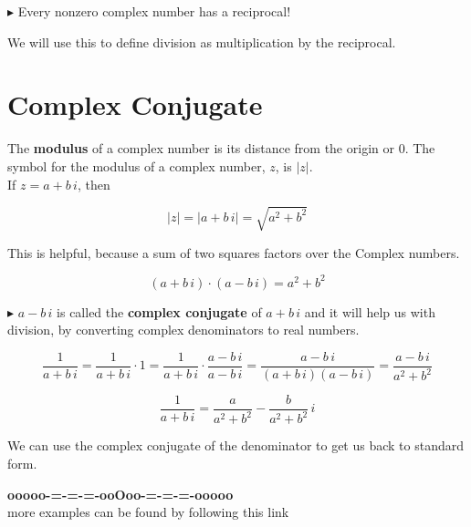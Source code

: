 \documentclass{ximera}
\begin{document}
$\blacktriangleright$  Every nonzero complex number has a reciprocal!  

We will use this to define division as multiplication by the reciprocal.





\section*{Complex Conjugate}


The \textbf{modulus} of a complex number is its distance from the origin or $0$.  The symbol for the modulus of a complex number, $z$, is $|z|$.  \\

If $z = a + b \, i$, then

\[    |z| = |a + b \, i| = \sqrt{a^2 + b^2}          \]



This is helpful, because a sum of two squares factors over the Complex numbers.



\[   (a + b \, i) \cdot    (a - b \, i)  = a^2 + b^2   \]



$\blacktriangleright$  $a - b \, i$ is called the \textbf{complex conjugate} of $a + b \, i$ and it will help us with division, by converting complex denominators to real numbers.




\[   \frac{1}{a + b \, i} =   \frac{1}{a + b \, i} \cdot 1 = \frac{1}{a + b \, i} \cdot \frac{a - b \, i}{a - b \, i}  =  \frac{a - b \, i}{(a + b \, i)(a - b \, i)} =   \frac{a - b \, i}{a^2 + b^2}  \]


\[  \frac{1}{a + b \, i}   =  \frac{a}{a^2 + b^2} - \frac{b}{a^2 + b^2} \, i      \]


We can use the complex conjugate of the denominator to get us back to standard form.















\begin{center}
\textbf{\textcolor{green!50!black}{ooooo-=-=-=-ooOoo-=-=-=-ooooo}} \\

more examples can be found by following this link\\ 

\end{center}
\end{document}

